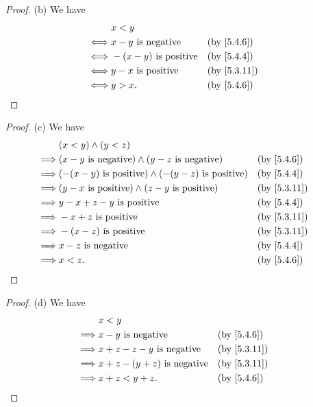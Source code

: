 \begin{proof}{(b)}
	We have
	\begin{align*}
		     & x < y                                         \\
		\iff & x - y \text{ is negative}    &  & \by{5.4.6}  \\
		\iff & -(x - y) \text{ is positive} &  & \by{5.4.4}  \\
		\iff & y - x \text{ is positive}    &  & \by{5.3.11} \\
		\iff & y > x.                       &  & \by{5.4.6}
	\end{align*}
\end{proof}

\begin{proof}{(c)}
	We have
	\begin{align*}
		         & (x < y) \land (y < z)                                                                \\
		\implies & (x - y \text{ is negative}) \land (y - z \text{ is negative})       &  & \by{5.4.6}  \\
		\implies & (-(x - y) \text{ is positive}) \land (-(y - z) \text{ is positive}) &  & \by{5.4.4}  \\
		\implies & (y - x \text{ is positive}) \land (z - y \text{ is positive})       &  & \by{5.3.11} \\
		\implies & y - x + z - y \text{ is positive}                                   &  & \by{5.4.4}  \\
		\implies & - x + z \text{ is positive}                                         &  & \by{5.3.11} \\
		\implies & -(x - z) \text{ is positive}                                        &  & \by{5.3.11} \\
		\implies & x - z \text{ is negative}                                           &  & \by{5.4.4}  \\
		\implies & x < z.                                                              &  & \by{5.4.6}
	\end{align*}
\end{proof}

\begin{proof}{(d)}
	We have
	\begin{align*}
		         & x < y                                                \\
		\implies & x - y \text{ is negative}           &  & \by{5.4.6}  \\
		\implies & x + z - z - y \text{ is negative}   &  & \by{5.3.11} \\
		\implies & x + z - (y + z) \text{ is negative} &  & \by{5.3.11} \\
		\implies & x + z < y + z.                      &  & \by{5.4.6}
	\end{align*}
\end{proof}

